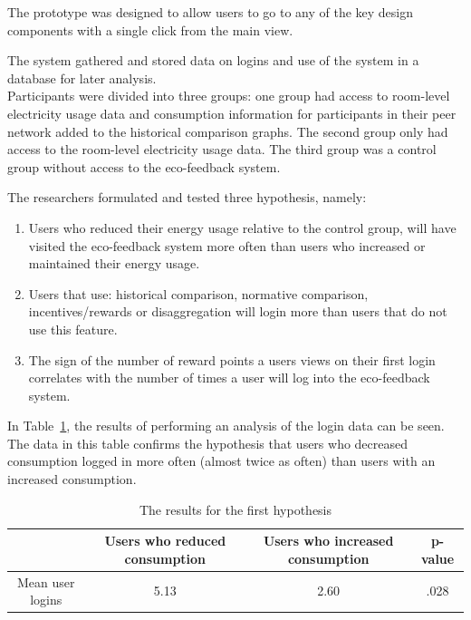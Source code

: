 \documentclass[journal]{vgtc}                %
\begin{document}
The prototype was designed to allow users to go to any of the key design components with a single click from the main view.

The system gathered and stored data on logins and use of the system in a database for later analysis.\\

Participants were divided into three groups: one group had access to room-level electricity usage data and consumption information for participants in their peer network added to the historical comparison graphs. 
The second group only had access to the room-level electricity usage data.
The third group was a control group without access to the eco-feedback system.

The researchers formulated and tested three hypothesis, namely:
\begin{enumerate}
\item Users who reduced their energy usage relative to the control group, will have visited the eco-feedback system more often than users who increased or maintained their energy usage.
\item Users that use: historical comparison, normative comparison, incentives/rewards or disaggregation will login more than users that do not use this feature.
\item The sign of the number of reward points a users views on their first login correlates with the number of times a user will log into the eco-feedback system.
\end{enumerate}

In Table~\ref{hypo1}, the results of performing an analysis of the login data can be seen. The data in this table confirms the hypothesis that users who decreased consumption logged in more often (almost twice as often) than users with an increased consumption. \\

\begin{table}
  \caption{The results for the first hypothesis}
  \label{hypo1}
  \scriptsize
  \begin{center}
    \begin{tabular}{cccc}
    \multicolumn{1}{p{1cm}}{\centering } &
       \multicolumn{1}{p{2.5cm}}{\centering Users who reduced consumption} &
       \multicolumn{1}{p{2.5cm}}{\centering Users who increased consumption} &
       \multicolumn{1}{p{1cm}}{\centering p-value} \\
    \hline
      Mean user logins &  5.13 & 2.60 & .028\\

    \end{tabular}
  \end{center}
\end{table}
\end{document}
